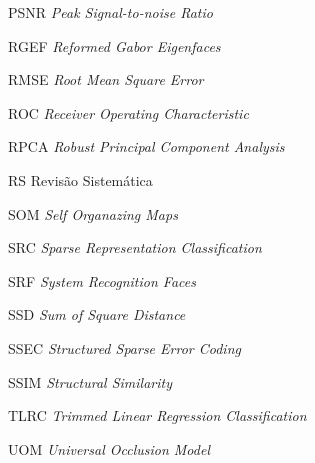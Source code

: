 \begin{siglas}
	\item[PSNR] \textit{Peak Signal-to-noise Ratio}
	\item[RGEF] \textit{Reformed Gabor Eigenfaces}
	\item[RMSE] \textit{Root Mean Square Error}
	\item[ROC] \textit{Receiver Operating Characteristic}
	\item[RPCA] \textit{Robust Principal Component Analysis}
	\item[RS] Revisão Sistemática
	\item[SOM] \textit{Self Organazing Maps}
	\item[SRC] \textit{Sparse Representation Classification}
	\item[SRF] \textit{System Recognition Faces}
	\item[SSD] \textit{Sum of Square Distance}
	\item[SSEC] \textit{Structured Sparse Error Coding}
	\item[SSIM] \textit{Structural Similarity}
	\item[TLRC] \textit{Trimmed Linear Regression Classification}
	\item[UOM] \textit{Universal Occlusion Model}


    
\end{siglas}



%

